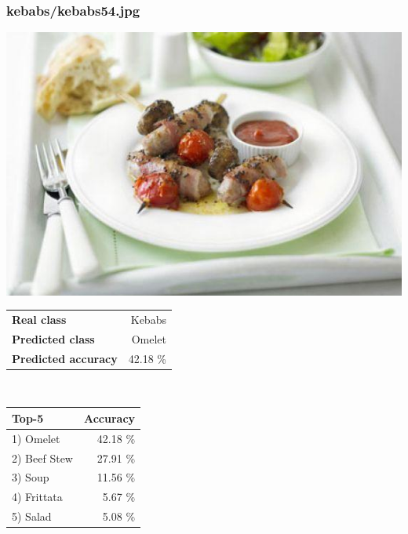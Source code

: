 \subsubsection{kebabs/kebabs54.jpg}

\begin{minipage}[t]{0.4\textwidth}
	\vspace{0pt}
	\includegraphics[width=\linewidth]{images/evaluation-images/kebabs/kebabs54.jpg}
\end{minipage}
\hfill
\begin{minipage}[t]{0.5\textwidth}
	\vspace{0pt}\raggedright
	\begin{tabularx}{\textwidth}{X r}
		\small \textbf{Real class} & \small Kebabs\\
		\small \textbf{Predicted class} & \small Omelet\\
		\small \textbf{Predicted accuracy} & \small 42.18 \%
    \end{tabularx}\\
    
    \vspace{6pt}
	\begin{tabularx}{\textwidth}{X r}
        \small \textbf{Top-5} & \small \textbf{Accuracy} \\
        \hline
		\small 1) Omelet & \small 42.18 \%\\\small 2) Beef Stew & \small 27.91 \%\\\small 3) Soup & \small 11.56 \%\\\small 4) Frittata & \small 5.67 \%\\\small 5) Salad & \small 5.08 \%
    \end{tabularx}
\end{minipage}
    

